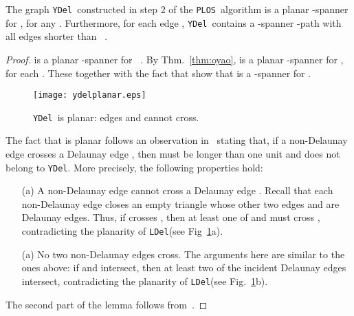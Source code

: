 \documentclass{llncs}
\newcommand{\ABox}{
\raisebox{3pt}{\framebox[6pt]{\rule{6pt}{0pt}}}
}
\newcommand{\palg}{{\tt PLOS}}
\newcommand{\ydel}{{\tt YDel}}
\newcommand{\ldel}{{\tt LDel}}
\begin{document}
\begin{lemma}
The graph \ydel\ constructed in step 2 of the \palg\ algorithm is a planar -spanner for , for any . Furthermore, for each edge , \ydel\ contains a -spanner -path with all edges shorter than ~\emph{\cite{WangLi03}}.
\label{lem:shortedges}
\end{lemma}
\begin{proof}
 is a planar -spanner for ~\cite{LCWW03}. By Thm.~\ref{thm:oyao},  is a planar -spanner for , for each . These together with the fact that  show that  is a -spanner for .

\begin{figure}[htbp]
\centering
\texttt{[image: ydelplanar.eps]}
\caption{\ydel\ is planar: edges  and  cannot cross.}
\label{fig:ydelplanar}
\end{figure}


The fact that  is planar follows an observation in~\cite{WangLi03} stating that, if a non-Delaunay edge  crosses a Delaunay edge , then  must be longer than one unit and does not belong to \ydel. More precisely, the following properties hold:
\begin{itemize}
\item[(a)] A non-Delaunay edge  cannot cross a Delaunay edge . Recall that each non-Delaunay edge  closes an empty triangle  whose other two edges  and  are Delaunay edges. Thus, if  crosses , then at least one of  and  must cross , contradicting the planarity of \ldel (see Fig~\ref{fig:ydelplanar}a).

\item[(a)] No two non-Delaunay edges  cross. The arguments here are similar to the ones above: if  and  intersect, then at least two of the incident Delaunay edges intersect, contradicting the planarity of \ldel (see Fig.~\ref{fig:ydelplanar}b).
\end{itemize}
The second part of the lemma follows from~\cite{WangLi03}. \hfill\ABox
\end{proof}
\end{document}
